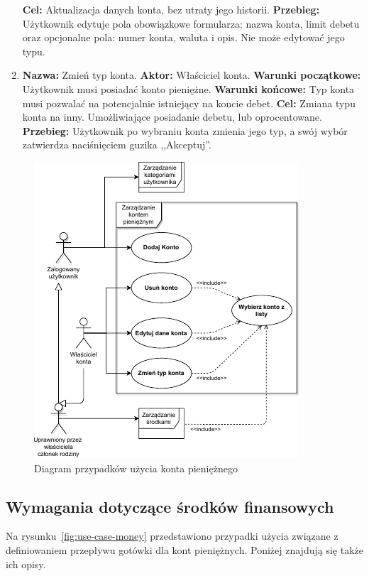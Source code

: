 \begin{enumerate}[labelwidth=1em,label=\arabic*.]
    \textbf{Cel:} Aktualizacja danych konta, bez utraty jego historii. \newline
    \textbf{Przebieg:} Użytkownik edytuje pola obowiązkowe formularza: nazwa konta, limit debetu oraz opcjonalne pola: numer konta, waluta i opis. Nie może edytować jego typu.
\item \label{last-item1}\textbf{Nazwa:} Zmień typ konta. \newline
    \textbf{Aktor:} Właściciel konta. \newline
    \textbf{Warunki początkowe:} Użytkownik musi posiadać konto pieniężne. \newline
    \textbf{Warunki końcowe:} Typ konta musi pozwalać na potencjalnie istniejący na koncie debet. \newline
    \textbf{Cel:} Zmiana typu konta na inny. Umożliwiające posiadanie debetu, lub oprocentowane. \newline
    \textbf{Przebieg:} Użytkownik po wybraniu konta zmienia jego typ, a swój wybór zatwierdza naciśnięciem guzika ,,Akceptuj''. 
\end{enumerate}

\begin{figure}[t]
	\centering
	\includegraphics[width=.65\linewidth]{rys03/use-case-account-2.pdf}
	\caption{Diagram przypadków użycia konta pieniężnego}
	\label{fig:use-case-account}
\end{figure}

\subsection{Wymagania dotyczące środków finansowych}
\label{subsec:wymagania-srodki-finansowe}
Na rysunku~\ref{fig:use-case-money} przedstawiono przypadki użycia związane z definiowaniem przepływu gotówki dla kont pieniężnych. Poniżej znajdują się także ich opisy.

